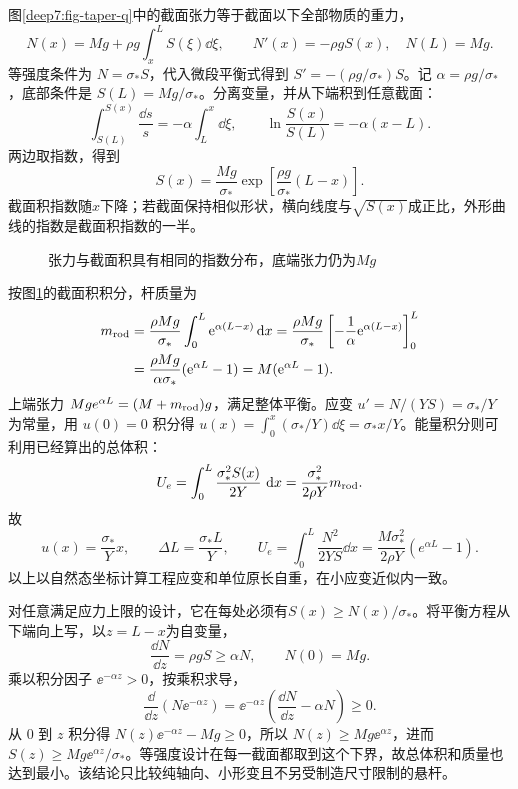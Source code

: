 \begin{solution}
图\ref{deep7:fig-taper-q}中的截面张力等于截面以下全部物质的重力，
\[
 N(x)=Mg+\rho g\int_x^LS(\xi)\dd\xi,
 \qquad N'(x)=-\rho gS(x),\quad N(L)=Mg.
\]
等强度条件为 $N=\sigma_*S$，代入微段平衡式得到 $S'=-(\rho g/\sigma_*)S$。记 $\alpha=\rho g/\sigma_*$，底部条件是 $S(L)=Mg/\sigma_*$。分离变量，并从下端积到任意截面：
\[
\int_{S(L)}^{S(x)}\frac{\dd s}{s}=-\alpha\int_L^x\dd\xi,\qquad
\ln\frac{S(x)}{S(L)}=-\alpha(x-L).
\]
两边取指数，得到
\[
 \boxed{S(x)=\frac{Mg}{\sigma_*}
 \exp\left[\frac{\rho g}{\sigma_*}(L-x)\right]}.
\]
截面积指数随$x$下降；若截面保持相似形状，横向线度与$\sqrt{S(x)}$成正比，外形曲线的指数是截面积指数的一半。
\begin{figure}[H]\centering
{}
\caption{张力与截面积具有相同的指数分布，底端张力仍为$Mg$}\label{deep7:fig-taper-s}
\end{figure}
按图\ref{deep7:fig-taper-s}的截面积积分，杆质量为
\[
\begin{aligned}
m_{\rm rod}&=\frac{\rho Mg}{\sigma_*}\int_0^L\mathrm e^{\alpha(L-x)}\mathop{}\!\mathrm d x
=\frac{\rho Mg}{\sigma_*}\left[-\frac1\alpha\mathrm e^{\alpha(L-x)}\right]_0^L\\
&=\frac{\rho Mg}{\alpha\sigma_*}(\mathrm e^{\alpha L}-1)
=M(\mathrm e^{\alpha L}-1).
\end{aligned}
\]
上端张力 $Mg e^{\alpha L}=(M+m_{\rm rod})g$，满足整体平衡。应变 $u'=N/(YS)=\sigma_*/Y$ 为常量，用 $u(0)=0$ 积分得 $u(x)=\int_0^x(\sigma_*/Y)\dd\xi=\sigma_*x/Y$。能量积分则可利用已经算出的总体积：
\[
U_e=\int_0^L\frac{\sigma_*^2S(x)}{2Y}\,\mathop{}\!\mathrm d x
=\frac{\sigma_*^2}{2\rho Y}m_{\rm rod}.
\]
故
\[
 u(x)=\frac{\sigma_*}{Y}x,\qquad
 \Delta L=\frac{\sigma_*L}{Y},\qquad
 U_e=\int_0^L\frac{N^2}{2YS}\dd x
 =\frac{M\sigma_*^2}{2\rho Y}(e^{\alpha L}-1).
\]
以上以自然态坐标计算工程应变和单位原长自重，在小应变近似内一致。

对任意满足应力上限的设计，它在每处必须有$S(x)\ge N(x)/\sigma_*$。将平衡方程从下端向上写，以$z=L-x$为自变量，
\[
 \frac{\dd N}{\dd z}=\rho gS\ge\alpha N,
 \qquad N(0)=Mg.
\]
乘以积分因子 $\ee^{-\alpha z}>0$，按乘积求导，
\[
\frac{\dd}{\dd z}(N\ee^{-\alpha z})
=\ee^{-\alpha z}\left(\frac{\dd N}{\dd z}-\alpha N\right)\ge0.
\]
从 $0$ 到 $z$ 积分得 $N(z)\ee^{-\alpha z}-Mg\ge0$，所以 $N(z)\ge Mg\ee^{\alpha z}$，进而 $S(z)\ge Mg\ee^{\alpha z}/\sigma_*$。等强度设计在每一截面都取到这个下界，故总体积和质量也达到最小。该结论只比较纯轴向、小形变且不另受制造尺寸限制的悬杆。
\end{solution}


